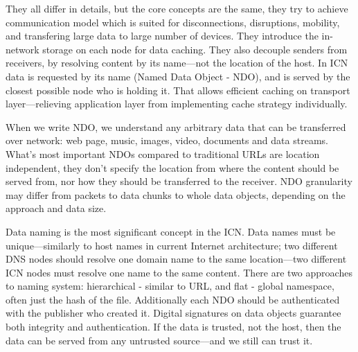\documentclass[nostrict]{szablonPG}
\begin{document}
They all differ in details, but the core concepts are the same, they try to achieve communication model which is suited for disconnections, disruptions, mobility, and transfering large data to large number of devices. They introduce the in-network storage on each node for data caching. They also decouple senders from receivers, by resolving content by its name---not the location of the host. 
In ICN data is requested by its name (Named Data Object - NDO), and is served by the closest possible node who is holding it. That allows efficient caching on transport layer---relieving application layer from implementing cache strategy individually. 

When we write NDO, we understand any arbitrary data that can be transferred over network: web page, music, images, video, documents and data streams. What's most important NDOs compared to traditional URLs are location independent, they don't specify the location from where the content should be served from, nor how they should be transferred to the receiver. NDO granularity may differ from packets to data chunks to whole data objects, depending on the approach and data size.

Data naming is the most significant concept in the ICN. Data names must be unique––similarly to host names in current Internet architecture; two different DNS nodes should resolve one domain name to the same location––two different ICN nodes must resolve one name to the same content. 
There are two approaches to naming system: hierarchical - similar to URL, and flat - global namespace, often just the hash of the file.
Additionally each NDO should be authenticated with the publisher who created it. Digital signatures on data objects guarantee both integrity and authentication. If the data is trusted, not the host, then the data can be served from any untrusted source––and we still can trust it.
\end{document}
